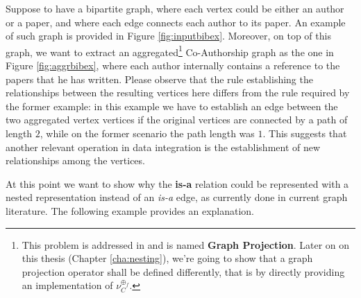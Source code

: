 \begin{example}\label{ex:bigraphbibnet}
Suppose to have a bipartite graph, where each vertex could be either an author or a paper, and where each edge connects each author to its paper. An example of such graph is provided in Figure \vref{fig:inputbibex}. Moreover, on top of this graph, we want to extract an aggregated\footnote{This problem is addressed in \cite{DMR} and is named \textbf{Graph Projection}. Later on on this thesis (Chapter \ref{cha:nesting}), we're going to show that a graph projection operator shall be defined differently, that is by directly providing an implementation of $\nu_C^{\oplus_f}$.} Co-Authorship graph as the one in Figure \ref{fig:aggrbibex}, where each author internally contains a reference to the papers that he has written. Please observe that the rule establishing the relationships between the resulting vertices here differs from the rule required by the former example: in this example we have to establish an edge between the two aggregated vertex vertices if the original vertices are connected by a path of length $2$, while on the former scenario the path length was $1$. This suggests that another relevant operation in data integration is the establishment of new relationships among the vertices. %
\end{example}

At this point we want to show why the \textbf{is-a} relation could be represented with a nested representation instead of an \textit{is-a} edge, as currently done in current graph literature. The following example provides an explanation.


